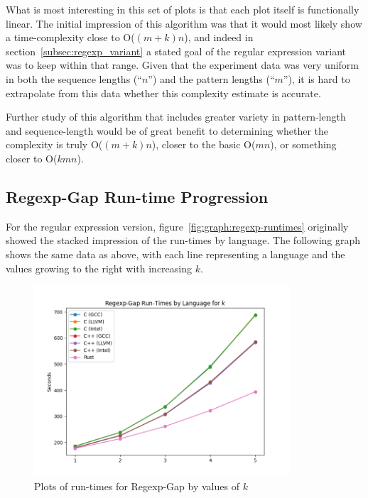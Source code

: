 What is most interesting in this set of plots is that each plot itself is functionally linear. The initial impression of this algorithm was that it would most likely show a time-complexity close to O($(m+k)n$), and indeed in section~\ref{subsec:regexp_variant} a stated goal of the regular expression variant was to keep within that range. Given that the experiment data was very uniform in both the sequence lengths (``$n$'') and the pattern lengths (``$m$''), it is hard to extrapolate from this data whether this complexity estimate is accurate.

Further study of this algorithm that includes greater variety in pattern-length and sequence-length would be of great benefit to determining whether the complexity is truly O($(m+k)n$), closer to the basic O($mn$), or something closer to O($kmn$).

\subsection{Regexp-Gap Run-time Progression}
\label{subsec:regexp-gap-runtimes}

For the regular expression version, figure~\ref{fig:graph:regexp-runtimes} originally showed the stacked impression of the run-times by language. The following graph shows the same data as above, with each line representing a language and the values growing to the right with increasing $k$.

\begin{figure}[h]
	\centering
	\includegraphics[width=0.85\textwidth]{figures/k_runtimes-regexp.png}
	\caption{Plots of run-times for Regexp-Gap by values of $k$}
	\label{fig:graph:k_runtimes-regexp}
\end{figure}

